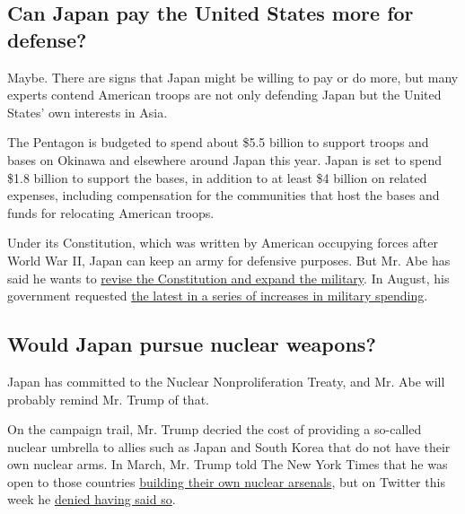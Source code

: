 \hypertarget{can-japan-pay-the-united-states-more-for-defense}{%
\subsection{Can Japan pay the United States more for
defense?}\label{can-japan-pay-the-united-states-more-for-defense}}

Maybe. There are signs that Japan might be willing to pay or do more,
but many experts contend American troops are not only defending Japan
but the United States' own interests in Asia.

The Pentagon is budgeted to spend about \$5.5 billion to support troops
and bases on Okinawa and elsewhere around Japan this year. Japan is set
to spend \$1.8 billion to support the bases, in addition to at least \$4
billion on related expenses, including compensation for the communities
that host the bases and funds for relocating American troops.

Under its Constitution, which was written by American occupying forces
after World War II, Japan can keep an army for defensive purposes. But
Mr. Abe has said he wants to
\href{http://www.nytimes3xbfgragh.onion/2016/07/12/world/asia/japan-election-shinzo-abe.html?rref=collection\%2Fbyline\%2Fmotoko-rich\&action=click\&contentCollection=undefined\&region=stream\&module=stream_unit\&version=latest\&contentPlacement=31\&pgtype=collection}{revise
the Constitution and expand the military}. In August, his government
requested
\href{http://www.nytimes3xbfgragh.onion/2016/08/31/world/asia/japan-defense-military-budget-shinzo-abe.html?rref=collection\%2Fbyline\%2Fmotoko-rich\&action=click\&contentCollection=undefined\&region=stream\&module=stream_unit\&version=latest\&contentPlacement=20\&pgtype=collection}{the
latest in a series of increases in military spending}.

\hypertarget{would-japan-pursue-nuclear-weapons}{%
\subsection{Would Japan pursue nuclear
weapons?}\label{would-japan-pursue-nuclear-weapons}}

Japan has committed to the Nuclear Nonproliferation Treaty, and Mr. Abe
will probably remind Mr. Trump of that.

On the campaign trail, Mr. Trump decried the cost of providing a
so-called nuclear umbrella to allies such as Japan and South Korea that
do not have their own nuclear arms. In March, Mr. Trump told The New
York Times that he was open to those countries
\href{http://www.nytimes3xbfgragh.onion/2016/03/27/us/politics/donald-trump-foreign-policy.html}{building
their own nuclear arsenals}, but on Twitter this week he
\href{https://twitter.com/realDonaldTrump/status/797832229800050688}{denied
having said so}.

